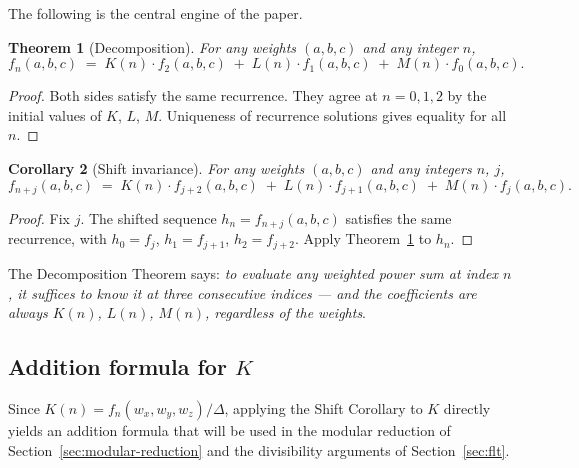 \documentclass[12pt]{article}
\newtheorem{theorem}{Theorem}[section]
\newtheorem{corollary}[theorem]{Corollary}
\theoremstyle{definition}
\begin{document}
	The following is the central engine of the paper.
	
	\begin{theorem}[Decomposition]
		\label{thm:decomposition}
		For any weights $(a,b,c)$ and any integer $n$,
		\[
		f_n(a,b,c) \;=\; K(n) \cdot f_2(a,b,c) \;+\; L(n) \cdot f_1(a,b,c) \;+\; M(n) \cdot f_0(a,b,c).
		\]
	\end{theorem}
	\begin{proof}
		Both sides satisfy the same recurrence.  They agree at $n=0,1,2$ by
		the initial values of $K$, $L$, $M$.  Uniqueness of recurrence
		solutions gives equality for all $n$.
	\end{proof}
	
	\begin{corollary}[Shift invariance]
		\label{cor:shift}
		For any weights $(a,b,c)$ and any integers $n$, $j$,
		\[
		f_{n+j}(a,b,c) \;=\; K(n) \cdot f_{j+2}(a,b,c) \;+\; L(n) \cdot f_{j+1}(a,b,c) \;+\; M(n) \cdot f_j(a,b,c).
		\]
	\end{corollary}
	\begin{proof}
		Fix $j$.  The shifted sequence $h_n = f_{n+j}(a,b,c)$ satisfies the
		same recurrence, with $h_0 = f_j$, $h_1 = f_{j+1}$, $h_2 = f_{j+2}$.
		Apply Theorem~\ref{thm:decomposition} to $h_n$.
	\end{proof}
	
	The Decomposition Theorem says: \emph{to evaluate any weighted power sum
		at index $n$, it suffices to know it at three consecutive indices — and
		the coefficients are always $K(n)$, $L(n)$, $M(n)$, regardless of the
		weights}.
	
	\subsection{Addition formula for $K$}
	
	Since $K(n) = f_n(w_x,w_y,w_z)/\Delta$, applying the Shift Corollary to $K$ directly yields an addition formula that will be used in the modular reduction of Section~\ref{sec:modular-reduction} and the divisibility arguments of Section~\ref{sec:flt}.
	
\end{document}
